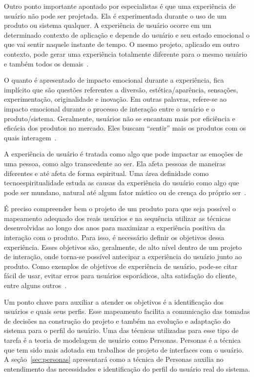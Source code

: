 Outro ponto importante apontado por especialistas é que uma experiência de usuário não pode ser projetada. Ela é experimentada durante o uso de um produto ou sistema qualquer. A experiência de usuário ocorre em um determinado contexto de aplicação e depende do usuário e seu estado emocional o que vai sentir naquele instante de tempo. O mesmo projeto, aplicado em outro contexto, pode gerar uma experiência totalmente diferente para o mesmo usuário e também todos os demais~\cite{hartson:2012}.

O quanto é apresentado de impacto emocional durante a experiência, fica implícito que são questões referentes a diversão, estética/aparência, sensações, experimentação, originalidade e inovação. Em outras palavras, refere-se ao impacto emocional durante o processo de interação entre o usuário e o produto/sistema. Geralmente, usuários não se encantam mais por eficiência e eficácia dos produtos no mercado. Eles buscam ``sentir'' mais os produtos com os quais interagem~\cite{hartson:2012}.

A experiência de usuário é tratada como algo que pode impactar as emoções de uma pessoa, como algo transcedente ao ser. Ela afeta pessoas de maneiras diferentes e até afeta de forma espiritual. Uma área definidade como tecnoespiritualidade estuda as causas da experiência do usuário como algo que pode ser mundano, natural até algum fator místico ou de crença do próprio ser~\cite{hartson:2012}.

É preciso compreender bem o projeto de um produto para que seja possível o mapeamento adequado dos reais usuários e na sequência utilizar as técnicas desenvolvidas ao longo dos anos para maximizar a experiência positiva da interação com o produto. Para isso, é necessário definir os objetivos dessa experiência. Esses objetivos são, geralmente, de alto nível dentro de um projeto de interação, onde torna-se possível antecipar a experiência do usuário junto ao produto. Como exemplos de objetivos de experiência de usuário, pode-se citar fácil de usar, evitar erros para usuários esporádicos, alta satisfação do cliente, entre alguns outros~\cite{hartson:2012}.

Um ponto chave para auxiliar a atender os objetivos é a identificação dos usuários e quais seus perfis. Esse mapeamento facilita a comunicação das tomadas de decisões na construção do projeto e também na evolução e adaptação do sistema para o perfil do usuário. Uma das técnicas utilizadas para esse tipo de tarefa é a teoria de modelagem de usuário como Personas. Personas é a técnica que tem sido mais adotada em trabalhos de projeto de interfaces com o usuário. A seção~\ref{sec:personas} apresentará como a técnica de Personas auxilia no entendimento das necessidades e identificação do perfil do usuário real do sistema.

